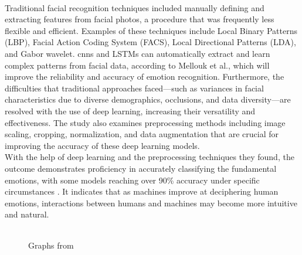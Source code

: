 \\
\indent Traditional facial recognition techniques included manually defining and extracting features from facial photos, a procedure that was frequently less flexible and efficient. 
Examples of these techniques include Local Binary Patterns (LBP), Facial Action Coding System (FACS), Local Directional Patterns (LDA), and Gabor wavelet. 
\gls{cnns} and LSTMs can automatically extract and learn complex patterns from facial data, according to Mellouk et al., which will improve the reliability and accuracy of emotion recognition. 
Furthermore, the difficulties that traditional approaches faced—such as variances in facial characteristics due to diverse demographics, occlusions, and data diversity—are resolved with the use of deep learning, increasing their versatility and effectiveness.
The study also examines preprocessing methods including image scaling, cropping, normalization, and data augmentation that are crucial for improving the accuracy of these deep learning models.
\\
\indent With the help of deep learning and the preprocessing techniques they found, the outcome demonstrates proficiency in accurately classifying the fundamental emotions, with some models reaching over 90\% accuracy under specific circumstances \cite{mellouk_2020_facial}. 
It indicates that as machines improve at deciphering human emotions, interactions between humans and machines may become more intuitive and natural.
\\
\begin{figure}[!ht]
    \centering
    \qquad
    \vspace{0.5cm}
    \\
    \scriptsize{Graphs from \cite{agrawal_2019_using}}
\end{figure}
